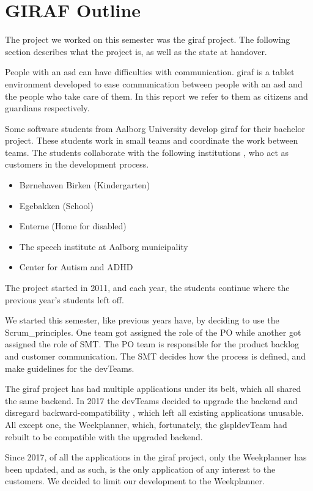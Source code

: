 \chapter{GIRAF Outline}

The project we worked on this semester was the \gls{giraf} project. The following section describes what the project is, as well as the state at handover.

People with an \gls{asd} can have difficulties with communication. \gls{giraf} is a tablet environment developed to ease communication between people with an \gls{asd} and the people who take care of them. In this report we refer to them as \glspl{citizen} and \glspl{guardian} respectively.

Some software students from Aalborg University develop \gls{giraf} for their bachelor project. These students work in small teams and coordinate the work between teams. The students collaborate with the following institutions \cite{GirafWebsite}, who act as customers in the development process.

\begin{itemize}
    \item Børnehaven Birken (Kindergarten) \cite{bhBirken}
    \item Egebakken (School) \cite{egebakken}
    \item Enterne (Home for disabled) \cite{enterne}
    \item The speech institute at Aalborg municipality
    \item Center for Autism and ADHD \cite{center_for_autism}
\end{itemize}

The project started in 2011, and each year, the students continue where the previous year's students left off. 

We started this semester, like previous years have, by deciding to use the \gls{Scrum_principles}. One team got assigned the role of the \gls{PO}  while another got assigned the role of \gls{SMT}. The \gls{PO} team is responsible for the product backlog and customer communication. The \gls{SMT} decides how the process is defined, and make guidelines for the \glspl{devTeam}.

The \gls{giraf} project has had multiple applications under its belt, which all shared the same backend. In 2017 the \glspl{devTeam} decided to upgrade the backend and disregard backward-compatibility \cite{SW608F18}, which left all existing applications unusable. All except one, the Weekplanner, which, fortunately, the glspl{devTeam} had rebuilt to be compatible with the upgraded backend.

Since 2017, of all the applications in the \gls{giraf} project, only the Weekplanner has been updated, and as such, is the only application of any interest to the customers. We decided to limit our development to the Weekplanner. 

